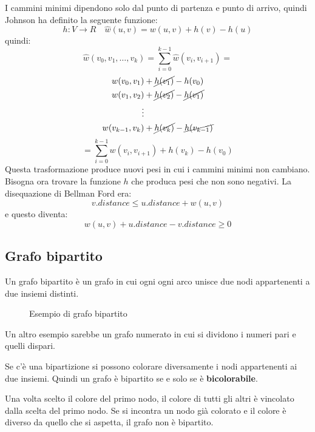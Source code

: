 \documentclass[a4paper]{article}
\begin{document}
I cammini minimi dipendono solo dal punto di partenza e punto di arrivo, quindi Johnson
ha definito la seguente funzione:
\[
  h: V \to R \quad \hat{w}(u,v) = w(u,v) + h(v) - h(u)
\] 
quindi:
\[
  \hat{w}(v_0,v_1, \ldots, v_k) = \sum_{i=0}^{k-1} \hat{w}(v_i,v_{i+1}) =
\] 
\[
\begin{aligned}
  w(v_0,v_1)& + \cancel{h(v_1)} - h(v_0)\\
  w(v_1,v_2)& + \cancel{h(v_2)} - \cancel{h(v_1)}\\
  \vdots\\
  w(v_{k-1},v_k)& + \cancel{h(v_k)} - \cancel{h(v_{k-1})}\\
\end{aligned}
\] 
\[
  = \sum_{i=0}^{k-1} w(v_i,v_{i+1}) + h(v_k) - h(v_0)
\] 
Questa trasformazione produce nuovi pesi in cui i cammini minimi non cambiano. Bisogna ora
trovare la funzione \( h \) che produca pesi che non sono negativi. La disequazione di
Bellman Ford era:
\[
  v.distance \le u.distance + w(u,v)
\] 
e questo diventa:
\[
  w(u,v) + u.distance - v.distance \ge 0
\] 

\subsection{Grafo bipartito}
Un grafo bipartito è un grafo in cui ogni ogni arco unisce due nodi appartenenti a
due insiemi distinti.
\begin{figure}[H]
  \centering
  \caption{Esempio di grafo bipartito}
\end{figure}
Un altro esempio sarebbe un grafo numerato in cui si dividono i numeri pari e quelli dispari.

\vspace{1em}
\noindent
Se c'è una bipartizione si possono colorare diversamente i nodi appartenenti ai due
insiemi. Quindi un grafo è bipartito se e solo se è \textbf{bicolorabile}.

Una volta scelto il colore del primo nodo, il colore di tutti gli altri è vincolato
dalla scelta del primo nodo. Se si incontra un nodo già colorato e il colore è
diverso da quello che si aspetta, il grafo non è bipartito.
\end{document}
